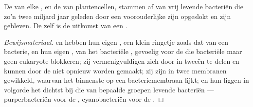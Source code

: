 \begin{proposition}\label{prop:g12:diversification-of-life:endosymbiosis}
De  van elke , en de  van
plantencellen, stammen af van vrij levende bacteriën die zo'n twee miljard
jaar geleden door een voorouderlijke  zijn opgeslokt en zijn gebleven.
De  zelf is de uitkomst van een .
\end{proposition}
\begin{proof}[Bewijsmateriaal]
 en  hebben hun eigen , een klein ringetje
zoals dat van een bacterie, en hun eigen , van het bacteriële
, gevoelig voor de  die bacteriële maar geen eukaryote
 blokkeren; zij vermenigvuldigen zich door in tweeën te delen en
kunnen door de  niet opnieuw worden gemaakt; zij zijn in twee
membranen gewikkeld, waarvan het binnenste op een bacteriemembraan lijkt;
en hun  liggen in volgorde het dichtst bij die van bepaalde groepen
levende bacteriën --- purperbacteriën voor de ,
cyanobacteriën voor de .
\end{proof}

